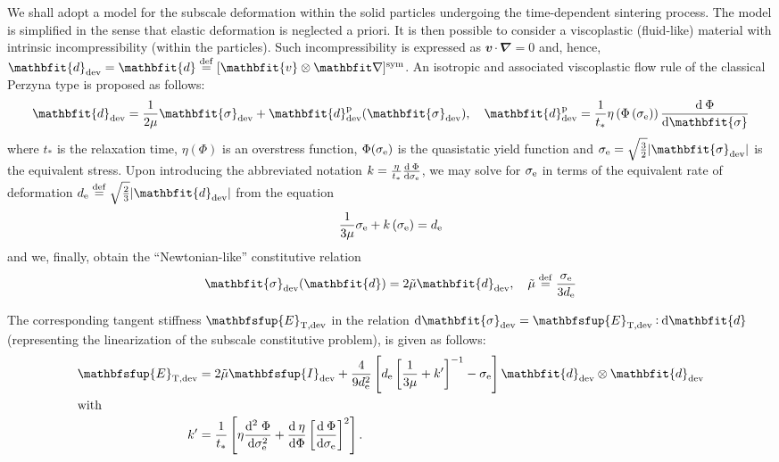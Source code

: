 \documentclass[12pt,review]{elsarticle}
\renewcommand{\ta}[1]{\mathbfit{#1}}
\renewcommand{\ts}[1]{\mathbfit{#1}}
\renewcommand{\tf}[1]{\mathbfsfup{#1}}
\newcommand{\tang}{\mathrm{T}}
\begin{document}
We shall adopt a model for the subscale deformation within the solid particles undergoing the time-dependent sintering process.
The model is simplified in the sense that elastic deformation is neglected a priori.
It is then possible to consider a viscoplastic (fluid-like) material with intrinsic incompressibility (within the particles).
Such incompressibility is expressed as $\ta{v}\cdot\ts{\nabla}=0$ and, hence, $\ts{d}_\dev=\ts{d}\defeq[\ta v\outerp\diff]^\sym$.
An isotropic and associated viscoplastic flow rule of the classical Perzyna type is proposed as follows:
\begin{equation}
    \ts{d}_\dev = \frac{1}{2\mu}\ts{\sigma}_\dev + \ts{d}_\dev^\pl(\ts{\sigma}_\dev), \quad
    \ts{d}_\dev^\pl = \frac{1}{t_*}\eta\left(\Phi\left(\sigma_\eqv\right)\right)\od{\Phi}{\ts\sigma}
\label{eq:d_sigma}
\end{equation}
where $t_*$ is the relaxation time, $\eta(\Phi)$ is an overstress function, $\Phi(\sigma_{\mathrm{e}})$ is the quasistatic yield function and $\sigma_\eqv=\sqrt{\frac{3}{2}}|\ts{\sigma}_\dev|$ is the equivalent stress.
Upon introducing the abbreviated notation $k=\frac{\eta}{t_*}\frac{\operatorname{d \!}\:\Phi}{\operatorname{d \!} \sigma_{\mathrm{e}}}$, we may solve for $\sigma_{\mathrm{e}}$ in terms of the equivalent rate of deformation $d_\eqv\defeq\sqrt{\frac{2}{3}}|\ts{d}_\dev|$ from the equation
\begin{equation}
    \frac{1}{3\mu}\sigma_{\mathrm{e}} + k\left(\sigma_{\mathrm{e}}\right) = d_{\mathrm{e}}
\label{eq:de_sigmae}
\end{equation}
and we, finally, obtain the ``Newtonian-like'' constitutive relation
\begin{equation}
    \ts{\sigma}_\dev(\ts{d}) = 2\tilde{\mu}\ts{d}_\dev, \quad
    \tilde{\mu}\defeq \frac{\sigma_\eqv}{3d_\eqv}
\label{eq:sigma_d}
\end{equation}

The corresponding tangent stiffness $\tf{E}_{\tang,\dev}$ in the relation $\dif\ts{\sigma}_\dev=\tf{E}_{\tang,\dev}\dprod\dif\ts{d}$ (representing the linearization of the subscale constitutive problem), is given as follows:
\begin{align}
 \tf E_{\tang,\dev} &= 2\tilde{\mu} \tf I_\dev + \frac{4}{9 d_\eqv^2} \left[ d_\eqv \left[ \frac{1}{3\mu} + k' \right]^{-1} - \sigma_\eqv \right] \ts d_\dev \outerp\ts d_\dev\\
\intertext{with}
 k' &= \frac{1}{t_*}\left[\eta \frac{\mathrm{d}^2\;\Phi}{\dif\sigma_\eqv^2} + \od{\eta}{\Phi}\left[\od{\Phi}{\sigma_\eqv}\right]^2\right].
\end{align}
\end{document}
